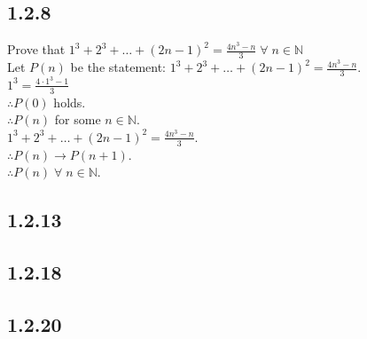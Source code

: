 \documentclass{article}
\begin{document}
\subsection{1.2.8}
Prove that $1^3 + 2^3 + \ldots + (2n-1)^2 =
\frac{4n^3-n}{3} \; \forall \; n \in \mathbb{N}$
\\Let $P(n)$ be the statement: $1^3 + 2^3 + \ldots + (2n-1)^2 =
\frac{4n^3-n}{3}$.
\\$1^3 = \frac{4 \cdot 1^3-1}{3}$
\\$\therefore P(0)$ holds.
\\$\therefore P(n)$ for some $n \in \mathbb{N}$.
\\$1^3 + 2^3 + \ldots + (2n-1)^2 =
\frac{4n^3-n}{3}$.
\\$\therefore P(n) \rightarrow P(n+1)$.
\\$\therefore P(n) \; \forall \; n \in \mathbb{N}$.

\subsection{1.2.13}

\subsection{1.2.18}

\subsection{1.2.20}
\end{document}
